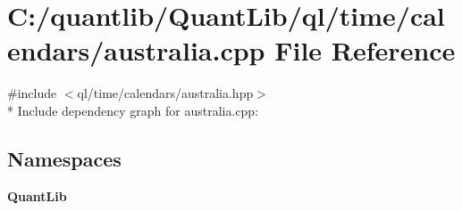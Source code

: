 \section{C\+:/quantlib/\+Quant\+Lib/ql/time/calendars/australia.cpp File Reference}
\label{australia_8cpp}
{\ttfamily \#include $<$ql/time/calendars/australia.\+hpp$>$}\\*
Include dependency graph for australia.\+cpp\+:
\subsection*{Namespaces}
\begin{DoxyCompactItemize}
\item 
 {\bf Quant\+Lib}
\end{DoxyCompactItemize}
